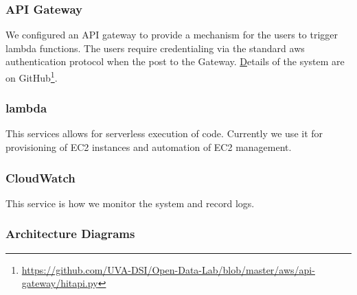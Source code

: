 \subsubsection{API Gateway}
We configured an API gateway to provide a mechanism for the users to trigger lambda functions. The users require credentialing via the standard aws authentication protocol when the post to the Gateway. \href{https://github.com/UVA-DSI/Open-Data-Lab/blob/master/aws/api-gateway/hitapi.py} Details of the system are on GitHub\footnote{\url{https://github.com/UVA-DSI/Open-Data-Lab/blob/master/aws/api-gateway/hitapi.py}}.



\subsubsection{lambda}
This services allows for serverless execution of code. Currently we use it for provisioning of EC2 instances and automation of EC2 management.


\subsubsection{CloudWatch}
This service is how we monitor the system and record logs.

\pagebreak
\subsubsection{Architecture Diagrams}


